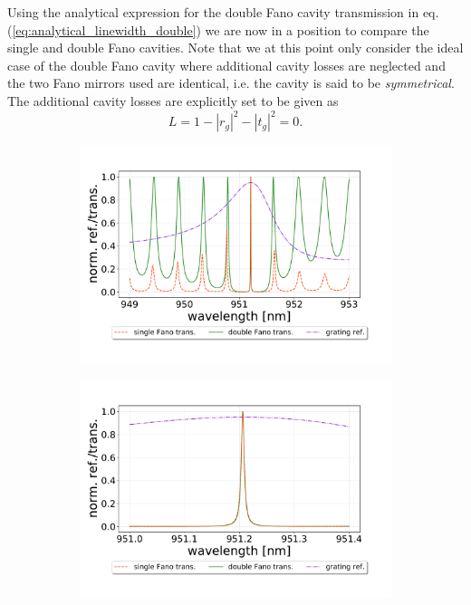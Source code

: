 Using the analytical expression for the double Fano cavity transmission in eq. (\ref{eq:analytical_linewidth_double}) we are now in a position to compare the single and double Fano cavities. Note that we at this point only consider the ideal case of the double Fano cavity where additional cavity losses are neglected and the two Fano mirrors used are identical, i.e. the cavity is said to be \emph{symmetrical}. The additional cavity losses are explicitly set to be given as
\begin{equation}
    L = 1-|r_g|^2-|t_g|^2 = 0.
\end{equation}

\begin{figure}[h!]
    \centering
    \begin{subfigure}[c]{0.49\textwidth}
        \centering
        \includegraphics[width=\textwidth]{figures/single_and_double_1000um.pdf}
        \caption{}
        \label{fig:double_in_standard_regime}
    \end{subfigure}
    \begin{subfigure}[c]{0.49\textwidth}
        \includegraphics[width=\textwidth]{figures/single_and_double_1000um_zoomed.pdf}

\end{subfigure}
\end{figure}
